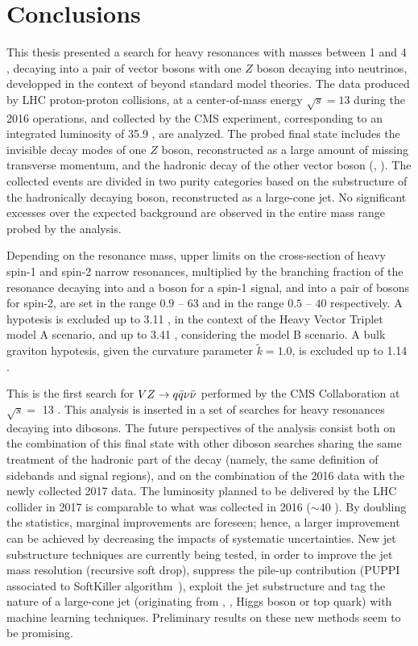 \chapter{Conclusions}
\label{ch:conclusion}

This thesis presented a search for heavy resonances with masses between 1 \TeV and 4 \TeV, decaying into a pair of vector bosons with one $Z$ boson decaying into neutrinos, developped in the context of beyond standard model theories. The data produced by LHC proton-proton collisions, at a center-of-mass energy $\sqrt{s}=13$ \TeV during the 2016 operations, and collected by the CMS experiment, corresponding to an integrated luminosity of 35.9 \fbinv, are analyzed. The probed final state includes the invisible decay modes of one $Z$ boson, reconstructed as a large amount of missing transverse momentum, and the hadronic decay of the other vector boson (\Z, \W). The collected events are divided in two purity categories based on the substructure of the hadronically decaying \V boson, reconstructed as a large-cone jet. No significant excesses over the expected background are observed in the entire mass range probed by the analysis.

\noindent Depending on the resonance mass, upper limits on the cross-section of heavy spin-1 and spin-2 narrow resonances, multiplied by the branching fraction of the resonance decaying into \Z and a \W boson for a spin-1 signal, and into a pair of \Z bosons for spin-2, are set in the range $0.9$ -- $63$ \fb and in the range $0.5$ -- $40$ \fb respectively. A \Wp hypotesis is excluded up to 3.11 \TeV, in the context of the Heavy Vector Triplet model A scenario, and up to 3.41 \TeV, considering the model B scenario. A bulk graviton hypotesis, given the curvature parameter $\tilde{k}=1.0$, is excluded up to 1.14 \TeV.

\vspace*{1\baselineskip}

\noindent This is the first search for $VZ \rightarrow q \bar{q} \nu \bar{\nu}$ performed by the CMS Collaboration at $\sqrt{s} = $ 13 \TeV. This analysis is inserted in a set of searches for heavy resonances decaying into dibosons. The future perspectives of the analysis consist both on the combination of this final state with other diboson searches sharing the same treatment of the hadronic part of the \V decay (namely, the same definition of sidebands and signal regions), and on the combination of the 2016 data with the newly collected 2017 data. The luminosity planned to be delivered by the LHC collider in 2017 is comparable to what was collected in 2016 ($\sim 40$ \fbinv). By doubling the statistics, marginal improvements are foreseen; hence, a larger improvement can be achieved by decreasing the impacts of systematic uncertainties. New jet substructure techniques are currently being tested, in order to improve the jet mass resolution (recursive soft drop), suppress the pile-up contribution (PUPPI associated to SoftKiller algorithm~\cite{Cacciari:2014gra}), exploit the jet substructure and tag the nature of a large-cone jet (originating from \W, \Z, Higgs boson or top quark) with machine learning techniques. Preliminary results on these new methods seem to be promising.


\clearpage

